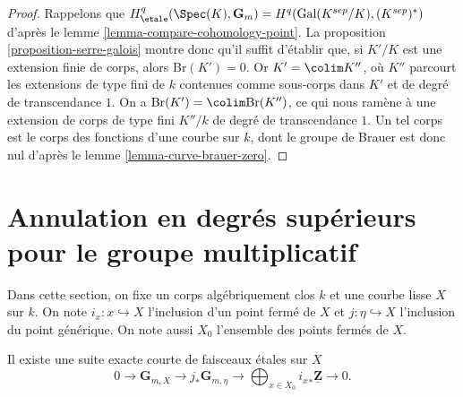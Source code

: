 \begin{proof}
Rappelons que
$H_\etale^q(\Spec(K), \mathbf{G}_m) = H^q(\text{Gal}(K^{sep}/K), (K^{sep})^*)$
d'après le lemme \ref{lemma-compare-cohomology-point}.
La proposition \ref{proposition-serre-galois} montre donc
qu'il suffit d'établir que, si $K'/K$ est une extension finie de corps, alors
$\text{Br}(K') = 0$. Or $K' = \colim K''$, où $K''$ parcourt
les extensions de type fini de $k$ contenues comme sous-corps dans $K'$ et de
degré de transcendance $1$.
On a $\text{Br}(K') = \colim \text{Br}(K'')$, ce qui nous ramène
à une extension de corps de type fini $K''/k$ de degré de transcendance
$1$. Un tel corps est le corps des fonctions d'une courbe sur $k$,
dont le groupe de Brauer est donc nul d'après le
lemme \ref{lemma-curve-brauer-zero}.
\end{proof}






\section{Annulation en degrés supérieurs pour le groupe multiplicatif}
\label{section-higher-Gm}

\noindent
Dans cette section, on fixe un corps algébriquement clos $k$ et une courbe lisse
$X$ sur $k$. On note $i_x : x \hookrightarrow X$ l'inclusion d'un point fermé
de $X$ et $j : \eta \hookrightarrow X$ l'inclusion du point générique.
On note aussi $X_0$ l'ensemble des points fermés de $X$.

\begin{theorem}
\label{theorem-fundamental-exact-sequence}
Il existe une suite exacte courte de faisceaux étales sur $X$
$$
0 \longrightarrow
\mathbf{G}_{m, X} \longrightarrow
j_* \mathbf{G}_{m, \eta} \longrightarrow
\bigoplus\nolimits_{x \in X_0} {i_x}_* \underline{\mathbf{Z}}
\longrightarrow 0.
$$
\end{theorem}


